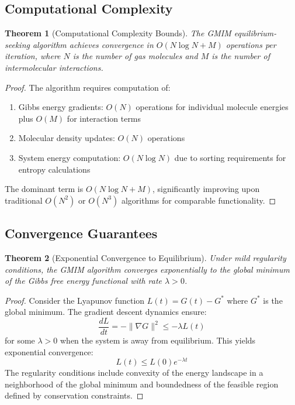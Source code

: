 \documentclass[11pt,a4paper]{article}
\newtheorem{theorem}{Theorem}[section]
\begin{document}
\subsection{Computational Complexity}

\begin{theorem}[Computational Complexity Bounds]
The GMIM equilibrium-seeking algorithm achieves convergence in $O(N \log N + M)$ operations per iteration, where $N$ is the number of gas molecules and $M$ is the number of intermolecular interactions.
\end{theorem}

\begin{proof}
The algorithm requires computation of:
\begin{enumerate}
\item Gibbs energy gradients: $O(N)$ operations for individual molecule energies plus $O(M)$ for interaction terms
\item Molecular density updates: $O(N)$ operations
\item System energy computation: $O(N \log N)$ due to sorting requirements for entropy calculations
\end{enumerate}
The dominant term is $O(N \log N + M)$, significantly improving upon traditional $O(N^2)$ or $O(N^3)$ algorithms for comparable functionality.
\end{proof}

\subsection{Convergence Guarantees}

\begin{theorem}[Exponential Convergence to Equilibrium]
Under mild regularity conditions, the GMIM algorithm converges exponentially to the global minimum of the Gibbs free energy functional with rate $\lambda > 0$.
\end{theorem}

\begin{proof}
Consider the Lyapunov function $L(t) = G(t) - G^*$ where $G^*$ is the global minimum. The gradient descent dynamics ensure:
\begin{equation}
\frac{dL}{dt} = -\|\nabla G\|^2 \leq -\lambda L(t)
\end{equation}
for some $\lambda > 0$ when the system is away from equilibrium. This yields exponential convergence:
\begin{equation}
L(t) \leq L(0) e^{-\lambda t}
\end{equation}
The regularity conditions include convexity of the energy landscape in a neighborhood of the global minimum and boundedness of the feasible region defined by conservation constraints.
\end{proof}
\end{document}
